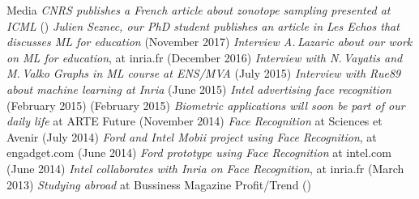 \documentclass{resume}
\begin{document}
\begin{category}{Media}
\citembullet
\emph{CNRS publishes a French article about zonotope sampling presented at ICML} ({})
\citembullet
\emph{Julien Seznec, our PhD student publishes an article in  Les Echos that discusses ML for education} ({\sf November 2017})
\citembullet
\emph{Interview A.\,Lazaric about our work on ML for education}, at inria.fr ({\sf December 2016})
\citembullet
\emph{Interview with N.\,Vayatis and M.\,Valko Graphs in ML course at ENS/MVA} ({\sf July 2015})
\citembullet
\emph{Interview with Rue89 about machine learning at Inria} ({\sf June 2015})
\citembullet
\emph{Intel advertising face recognition} (February 2015) ({\sf February 2015})
\citembullet
\emph{Biometric applications will soon be part of our daily life} at ARTE Future ({\sf November 2014})
\citembullet
\emph{Face Recognition} at Sciences et Avenir ({\sf July 2014})
\citembullet
\emph{Ford and Intel Mobii project using Face Recognition}, at engadget.com ({\sf June 2014}) 
\citembullet
\emph{Ford prototype using Face Recognition} at intel.com ({\sf June 2014}) 
\citembullet
\emph{Intel collaborates with Inria on Face Recognition}, at inria.fr ({\sf March 2013}) 
\citembullet
\emph{Studying abroad} at Bussiness Magazine Profit/Trend  ({})
 \end{category}







\end{document}
